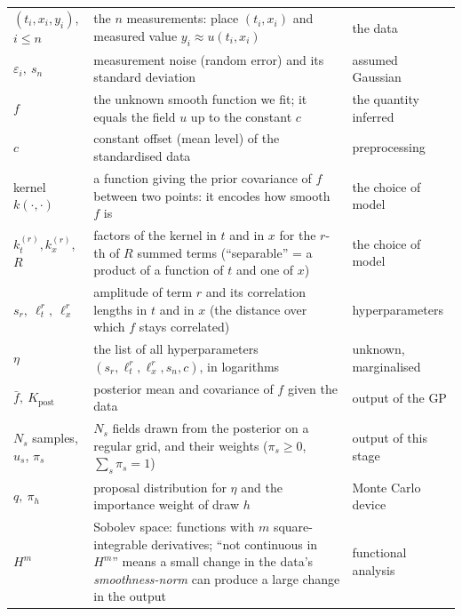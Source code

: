 \documentclass[11pt,a4paper]{article}
\theoremstyle{definition}
\begin{document}
\begin{symbols}
\begin{tabular}{@{}L{2.5cm}L{6.0cm}L{4.4cm}@{}}
$(t_i,x_i,y_i)$, $i\le n$ & the $n$ measurements: place $(t_i,x_i)$ and measured value $y_i\approx u(t_i,x_i)$ & the data\\
$\varepsilon_i,\ s_n$ & measurement noise (random error) and its standard deviation & assumed Gaussian\\
$f$ & the unknown smooth function we fit; it equals the field $u$ up to the constant $c$ & the quantity inferred\\
$c$ & constant offset (mean level) of the standardised data & preprocessing\\
kernel $k(\cdot,\cdot)$ & a function giving the prior covariance of $f$ between two points: it encodes how smooth $f$ is & the choice of model\\
$k_t^{(r)},k_x^{(r)}$, $R$ & factors of the kernel in $t$ and in $x$ for the $r$-th of $R$ summed terms (``separable'' = a product of a function of $t$ and one of $x$) & the choice of model\\
$s_r,\ \ell_t^r,\ \ell_x^r$ & amplitude of term $r$ and its correlation lengths in $t$ and in $x$ (the distance over which $f$ stays correlated) & hyperparameters\\
$\eta$ & the list of all hyperparameters $(s_r,\ell_t^r,\ell_x^r,s_n,c)$, in logarithms & unknown, marginalised\\
$\bar f,\ K_{\mathrm{post}}$ & posterior mean and covariance of $f$ given the data & output of the GP\\
$N_s$ samples, $\hat u_s$, $\pi_s$ & $N_s$ fields drawn from the posterior on a regular grid, and their weights ($\pi_s\ge0$, $\sum_s\pi_s=1$) & output of this stage\\
$q,\ \pi_h$ & proposal distribution for $\eta$ and the importance weight of draw $h$ & Monte Carlo device\\
$H^m$ & Sobolev space: functions with $m$ square-integrable derivatives; ``not continuous in $H^m$'' means a small change in the data's \emph{smoothness-norm} can produce a large change in the output & functional analysis\\
\end{tabular}
\end{symbols}
\end{document}
